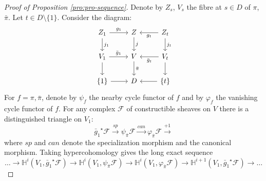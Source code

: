 \documentclass[11pt, reqno]{amsart}
\theoremstyle{plain}
\theoremstyle{definition}
\newcommand{\HH}{\mathbb{H}}
\begin{document}
\begin{proof}[Proof of Proposition \ref{pro:pro-sequence}]
Denote by $Z_s$, $V_s$ the fibre at $s \in D$  of $\pi$, $\bar{\pi}$. Let $t \in D \setminus \{1\}$. Consider the diagram: 
\begin{equation}
 \label{eq:diagram}
  \begin{tikzcd}
Z_1 \rar{g_1}  \dar{j_1} &   Z  \dar{j} & \lar{g_t}   Z_t \dar{j_t}\\
V_1 \rar{\bar{g}_1}  \dar{} &   V \dar{\bar{\pi}}   & \lar{\bar{g}_t}  V_t  \dar{}\\
\{ 1 \}  \rar{} & D & \lar{} \{ t \} 
\end{tikzcd}
\end{equation}
For $f=\pi,\bar{\pi}$, denote by $\psi_{f}$ the nearby cycle functor of $f$ and by $\varphi_{f}$   the vanishing cycle functor of $f$. 
For any complex $\mathcal{F}$ of constructible sheaves on $V$ there is a distinguished triangle on $V_1$:
\begin{equation}
\label{eq:triangle}
 {\bar{g}_1}^\star \mathcal{F} \xrightarrow{sp} \psi_{\bar{\pi}} \mathcal{F} \xrightarrow{can} \varphi_{\bar{\pi}}\mathcal{F}  \xrightarrow{+1}
\end{equation}
where ${sp}$ and ${can}$ denote the specialization morphism and the canonical morphism.
Taking hypercohomology gives the long exact sequence
\begin{equation}
\label{eq:hypercohomology}
    \dots \to \HH^i(V_1, {\bar{g}_1}^\star \mathcal{F}) \to  \HH^i(V_1, \psi_{\bar{\pi}} \mathcal{F}) \to \HH^i(V_1, \varphi_{\bar{\pi}} \mathcal{F}) \to  \HH^{i+1}(V_1, {\bar{g}_1}^\star \mathcal{F}) \to \dots
\end{equation}



\end{proof}
\end{document}
